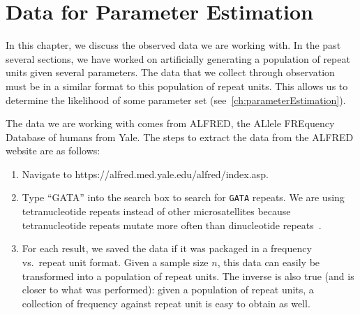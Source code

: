 \chapter{Data for Parameter Estimation}\label{ch:dataForParameterEstimation}
In this chapter, we discuss the observed data we are working with.
In the past several sections, we have worked on artificially generating a population of repeat units given several
parameters.
The data that we collect through observation must be in a similar format to this population of repeat units.
This allows us to determine the likelihood of some parameter set (see~\autoref{ch:parameterEstimation}).

The data we are working with comes from ALFRED, the ALlele FREquency Database of humans from Yale.
The steps to extract the data from the ALFRED website are as follows:
\begin{enumerate}
    \item Navigate to https://alfred.med.yale.edu/alfred/index.asp.
    \item Type ``GATA'' into the search box to search for \texttt{GATA} repeats.
        We are using tetranucleotide repeats instead of other microsatellites because tetranucleotide repeats mutate
        more often than dinucleotide repeats~\cite{supleeRelativeStabilitiesDinucleotide1999}.
    \item For each result, we saved the data if it was packaged in a frequency vs.\ repeat unit format.
        Given a sample size $n$, this data can easily be transformed into a population of repeat units.
        The inverse is also true (and is closer to what was performed): given a population of repeat units,
        a collection of frequency against repeat unit is easy to obtain as well.
\end{enumerate}

